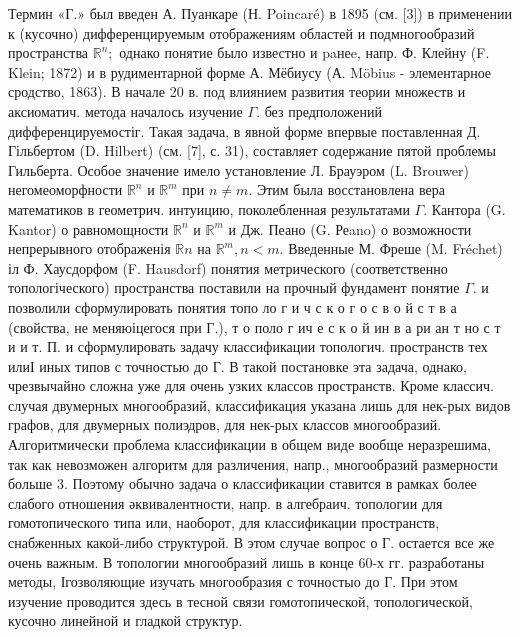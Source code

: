 \documentclass[10pt]{article}
\begin{document}
Термин «Г.» был введен А. Пуанкаре (Н. Poincaré) в 1895 (см. [3]) в применении к (кусочно) дифференцируемым отображениям областей и подмногообразий пространства $\mathbb{R}^{n} ;$ однако понятие было известно и paнеe, напр. Ф. Клейну (F. Klein; 1872) и в рудиментарной форме А. Мёбиусу (А. Möbius - элементарное сродство, 1863). В начале 20 в. под влиянием развития теории множеств и аксиоматич. метода началось изучение $\Gamma$. без предположений дифференцируемостіг. Такая задача, в явной форме впервые поставленная Д. Гільбертом (D. Hilbert) (см. [7], с. 31), составляет содержание пятой проблемы Гильберта. Особое значение имело установление Л. Брауэром (L. Brouwer) негомеоморфности $\mathbb{R}^{n}$ и $\mathbb{R}^{m}$ при $n \neq m$. Этим была восстановлена вера математиков в геометрич. интуицию, поколебленная результатами $\Gamma$. Кантора (G. Kantor) о равномощности $\mathbb{R}^{n}$ и $\mathbb{R}^{m}$ и Дж. Пеано (G. Реano) о возможности непрерывного отображенія $\mathbb{R} n$ на $\mathbb{R}^{m}, n<m$. Введенные М. Фреше (M. Fréchet) іл Ф. Хаусдорфом (F. Hausdorf) понятия метрического (соответственно топологіческого) пространства поставили на прочный фундамент понятие $\Gamma$. и позволили сформулировать понятия топо ло г и ч с к о г о с в о й с т в а (свойства, не меняюіцегося при Г.), т о поло г ич е с к о й ин в а ри ан т но с т и и т. П. и сформулировать задачу классификации топологич. пространств тех илиІ иных типов с точностью до Г. В такой постановке эта задача, однако, чрезвычайно сложна уже для очень узких классов пространств. Кроме классич. случая двумерных многообразий, классификация указана лишь для нек-рых видов графов, для двумерных полиэдров, для нек-рых классов многообразий. Алгоритмически проблема классификации в общем виде вообще неразрешима, так как невозможен алгоритм для различения, напр., многообразий размерности больше 3. Поэтому обычно задача о классификации ставится в рамках более слабого отношения әквивалентности, напр. в алгебраич. топологии для гомотопического типа или, наоборот, для классификации пространств, снабженных какой-либо структурой. В этом случае вопрос о Г. остается все же очень важным. В топологии многообразий лишь в конце 60-х гг. разработаны методы, Ігозволяющие изучать многообразия с точностыо до $Г$. При этом изучение проводится здесь в тесной связи гомотопической, топологической, кусочно линейной и гладкой структур.
\end{document}
